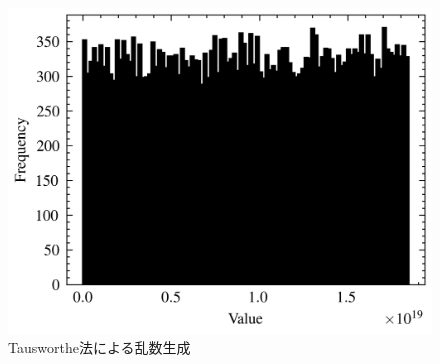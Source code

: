 \begin{figure}
    \centering
    \includegraphics[width=0.8\linewidth]{src/figures/tausworthe/tausworthe.png}
    \caption{Tausworthe法による乱数生成}\label{fig:tausworthe}
\end{figure}
